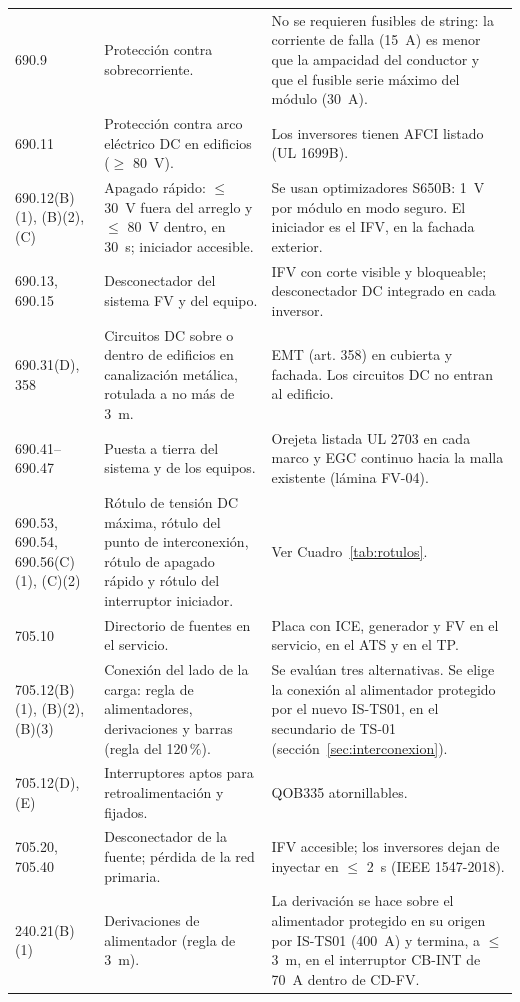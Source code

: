 \documentclass[12pt]{article}
\begin{document}
{\begin{longtable}{L{2.25cm}L{5.85cm}L{6.9cm}}
690.9 & Protección contra sobrecorriente. & No se requieren fusibles de string: la corriente de falla (\SI{15}{\ampere}) es menor que la ampacidad del conductor y que el fusible serie máximo del módulo (\SI{30}{\ampere}).\\
690.11 & Protección contra arco eléctrico DC en edificios ($\geq$ \SI{80}{\volt}). & Los inversores tienen AFCI listado (UL 1699B).\\
690.12(B)(1), (B)(2), (C) & Apagado rápido: $\leq$ \SI{30}{\volt} fuera del arreglo y $\leq$ \SI{80}{\volt} dentro, en 30~s; iniciador accesible. & Se usan optimizadores S650B: \SI{1}{\volt} por módulo en modo seguro. El iniciador es el IFV, en la fachada exterior.\\
690.13, 690.15 & Desconectador del sistema FV y del equipo. & IFV con corte visible y bloqueable; desconectador DC integrado en cada inversor.\\
690.31(D), 358 & Circuitos DC sobre o dentro de edificios en canalización metálica, rotulada a no más de 3~m. & EMT (art. 358) en cubierta y fachada. Los circuitos DC no entran al edificio.\\
690.41--690.47 & Puesta a tierra del sistema y de los equipos. & Orejeta listada UL 2703 en cada marco y EGC continuo hacia la malla existente (lámina FV-04).\\
690.53, 690.54, 690.56(C)(1), (C)(2) & Rótulo de tensión DC máxima, rótulo del punto de interconexión, rótulo de apagado rápido y rótulo del interruptor iniciador. & Ver Cuadro~\ref{tab:rotulos}.\\
705.10 & Directorio de fuentes en el servicio. & Placa con ICE, generador y FV en el servicio, en el ATS y en el TP.\\
705.12(B)(1), (B)(2), (B)(3) & Conexión del lado de la carga: regla de alimentadores, derivaciones y barras (regla del 120\,\%). & Se evalúan tres alternativas. Se elige la conexión al alimentador protegido por el nuevo IS-TS01, en el secundario de TS-01 (sección~\ref{sec:interconexion}).\\
705.12(D), (E) & Interruptores aptos para retroalimentación y fijados. & QOB335 atornillables.\\
705.20, 705.40 & Desconectador de la fuente; pérdida de la red primaria. & IFV accesible; los inversores dejan de inyectar en $\leq$ \SI{2}{\second} (IEEE 1547-2018).\\
240.21(B)(1) & Derivaciones de alimentador (regla de 3~m). & La derivación se hace sobre el alimentador protegido en su origen por IS-TS01 (400~A) y termina, a $\leq$ \SI{3}{\meter}, en el interruptor CB-INT de \SI{70}{\ampere} dentro de CD-FV.\\

\end{longtable}}
\end{document}

